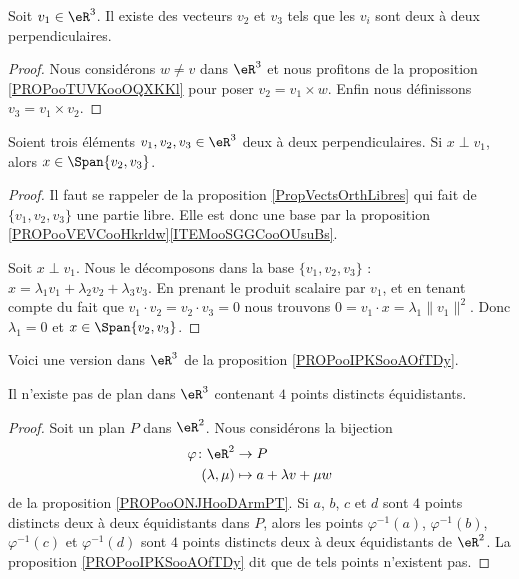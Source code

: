 \begin{lemma}       \label{LEMooGUVMooPXtXnV}
	Soit \( v_1\in \eR^3\). Il existe des vecteurs \( v_2\) et \( v_3\) tels que les \( v_i\) sont deux à deux perpendiculaires.
\end{lemma}

\begin{proof}
	Nous considérons \( w\neq v\) dans \( \eR^3\) et nous profitons de la proposition \ref{PROPooTUVKooOQXKKl} pour poser \( v_2=v_1\times w\). Enfin nous définissons \( v_3=v_1\times v_2\).
\end{proof}

\begin{lemma}       \label{LEMooGXGCooDfgbqG}
	Soient trois éléments \( v_1,v_2,v_3\in \eR^3\) deux à deux perpendiculaires. Si \( x\perp v_1\), alors \( x\in \Span\{ v_2,v_3 \}\).
\end{lemma}

\begin{proof}
	Il faut se rappeler de la proposition \ref{PropVectsOrthLibres} qui fait de \( \{ v_1,v_2,v_3 \}\) une partie libre. Elle est donc une base par la proposition \ref{PROPooVEVCooHkrldw}\ref{ITEMooSGGCooOUsuBs}.

	Soit \( x\perp v_1\). Nous le décomposons dans la base \( \{ v_1,v_2,v_3 \}\) : \( x=\lambda_1 v_1+\lambda_2 v_2+\lambda_3v_3\). En prenant le produit scalaire par \( v_1\), et en tenant compte du fait que \( v_1\cdot v_2=v_2\cdot v_3=0\) nous trouvons \( 0=v_1\cdot x=\lambda_1\| v_1 \|^2\). Donc \( \lambda_1=0\) et \( x\in \Span\{ v_2,v_3 \}\).
\end{proof}

Voici une version dans \( \eR^3\) de la proposition \ref{PROPooIPKSooAOfTDy}.

\begin{proposition}	\label{PROPooVSOQooMwxHNa}
	Il n'existe pas de plan dans \( \eR^3\) contenant \( 4\) points distincts équidistants.
\end{proposition}

\begin{proof}
	Soit un plan \( P\) dans \( \eR^2\). Nous considérons la bijection
	\begin{equation}
		\begin{aligned}
			\varphi\colon \eR^2 & \to P                     \\
			(\lambda, \mu)      & \mapsto a+\lambda v+\mu w
		\end{aligned}
	\end{equation}
	de la proposition \ref{PROPooONJHooDArmPT}. Si \( a\), \( b\), \( c\) et \( d\) sont \( 4\) points distincts deux à deux équidistants dans \( P\), alors les points \( \varphi^{-1}(a)\), \( \varphi^{-1}(b)\), \( \varphi^{-1}(c)\) et \( \varphi^{-1}(d)\) sont \( 4\) points distincts deux à deux équidistants de \( \eR^2\). La proposition \ref{PROPooIPKSooAOfTDy} dit que de tels points n'existent pas.
\end{proof}

